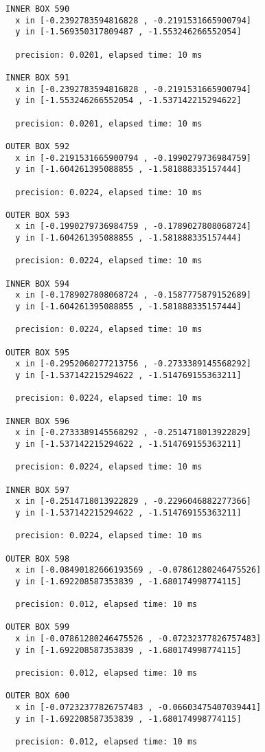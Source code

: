 \begin{verbatim}
INNER BOX 590
  x in [-0.2392783594816828 , -0.2191531665900794]
  y in [-1.569350317809487 , -1.553246266552054]

  precision: 0.0201, elapsed time: 10 ms

INNER BOX 591
  x in [-0.2392783594816828 , -0.2191531665900794]
  y in [-1.553246266552054 , -1.537142215294622]

  precision: 0.0201, elapsed time: 10 ms

OUTER BOX 592
  x in [-0.2191531665900794 , -0.1990279736984759]
  y in [-1.604261395088855 , -1.581888335157444]

  precision: 0.0224, elapsed time: 10 ms

OUTER BOX 593
  x in [-0.1990279736984759 , -0.1789027808068724]
  y in [-1.604261395088855 , -1.581888335157444]

  precision: 0.0224, elapsed time: 10 ms

INNER BOX 594
  x in [-0.1789027808068724 , -0.1587775879152689]
  y in [-1.604261395088855 , -1.581888335157444]

  precision: 0.0224, elapsed time: 10 ms

OUTER BOX 595
  x in [-0.2952060277213756 , -0.2733389145568292]
  y in [-1.537142215294622 , -1.514769155363211]

  precision: 0.0224, elapsed time: 10 ms

INNER BOX 596
  x in [-0.2733389145568292 , -0.2514718013922829]
  y in [-1.537142215294622 , -1.514769155363211]

  precision: 0.0224, elapsed time: 10 ms

INNER BOX 597
  x in [-0.2514718013922829 , -0.2296046882277366]
  y in [-1.537142215294622 , -1.514769155363211]

  precision: 0.0224, elapsed time: 10 ms

OUTER BOX 598
  x in [-0.08490182666193569 , -0.07861280246475526]
  y in [-1.692208587353839 , -1.680174998774115]

  precision: 0.012, elapsed time: 10 ms

OUTER BOX 599
  x in [-0.07861280246475526 , -0.07232377826757483]
  y in [-1.692208587353839 , -1.680174998774115]

  precision: 0.012, elapsed time: 10 ms

OUTER BOX 600
  x in [-0.07232377826757483 , -0.06603475407039441]
  y in [-1.692208587353839 , -1.680174998774115]

  precision: 0.012, elapsed time: 10 ms


\end{verbatim}
